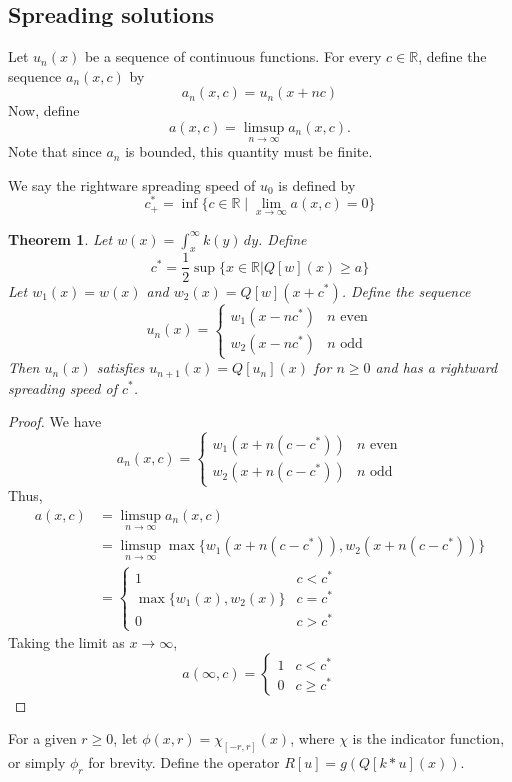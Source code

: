 \documentclass[11pt]{article}
\newtheorem{thm}{Theorem}
\theoremstyle{definition}
\numberwithin{equation}{section}
\numberwithin{thm}{section}
\renewcommand{\a}{a}
\begin{document}
\subsection{Spreading solutions}

Let $u_n(x)$ be a sequence of continuous functions. For every $c \in \mathbb R$, define the sequence $a_n(x,c)$ by
$$ a_n(x,c) = u_n(x+nc) $$
Now, define
$$ a(x,c) = \limsup_{n\to\infty} a_n(x,c). $$
Note that since $a_n$ is bounded, this quantity must be finite.

We say the rightware spreading speed of $u_0$ is defined by
$$ c^*_+ = \inf \{ c \in \mathbb R \mid \lim_{x\to\infty} a(x,c) = 0 \} $$

\begin{thm}
Let $w(x) = \int_x^\infty k(y) \, dy$. Define
$$ c^* = \frac{1}{2} \sup \{ x\in\mathbb R | Q[w](x) \geq \a \} $$
Let $w_1(x) = w(x)$ and $w_2(x) = Q[w](x+c^*)$. Define the sequence
$$ u_n(x) = \begin{cases}
w_1(x-nc^*) & n \text{ even} \\
w_2(x-nc^*) & n \text{ odd}
\end{cases} $$
Then $u_n(x)$ satisfies $u_{n+1}(x) = Q[u_n](x)$ for $n\geq 0$ and has a rightward spreading speed of $c^*$.
\end{thm}

\begin{proof}
We have
$$ a_n(x,c) = \begin{cases}
w_1(x + n(c-c^*))  & n \text{ even} \\
w_2(x + n(c-c^*)) & n \text{ odd}
\end{cases} $$
Thus,
$$ \begin{aligned}
a(x,c) &= \limsup_{n\to\infty} a_n(x,c) \\
&= \limsup_{n\to\infty} \max \{ w_1(x + n(c-c^*)), w_2(x + n(c-c^*)) \} \\
&= \begin{cases}
1 & c < c^* \\
\max\{w_1(x),w_2(x)\} & c=c^* \\
0 & c>c^*
\end{cases} \end{aligned} $$
Taking the limit as $x\to\infty$,
$$ a(\infty,c) = \begin{cases}
1 & c < c^* \\
0 & c \geq c^*
\end{cases} $$
\end{proof}



For a given $r \geq 0$, let $\phi(x,r) = \chi_{[-r,r]}(x)$, where $\chi$ is the indicator function, or simply $\phi_r$ for brevity. Define the operator $R[u] = g\left( Q[k*u](x) \right)$.
\end{document}
